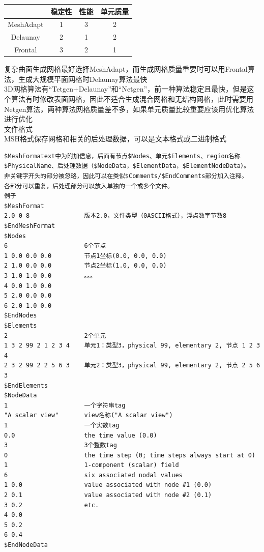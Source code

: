 \documentclass[12pt]{article}
\begin{document}
\begin{CJK}{UTF8}{gkai}
\begin{table}
	\centering
\begin{tabular}{ cccc }   
	\hline
&稳定性& 性能& 单元质量\\
\hline
MeshAdapt   & 1        & 3 &        2\\
Delaunay     &      2    &     1  &       2\\
Frontal       &        3&         2 &        1\\
\hline
\end{tabular}
\end{table}

复杂曲面生成网格最好选择MeshAdapt，而生成网格质量重要时可以用Frontal算法，生成大规模平面网格时Delaunay算法最快\\
3D网格算法有“Tetgen+Delaunay”和“Netgen”，前一种算法稳定且最快，但是这个算法有时修改表面网格，因此不适合生成混合网格和无结构网格，此时需要用Netgen算法，两种算法网格质量差不多，如果单元质量比较重要应该用优化算法进行优化\\

文件格式\\
MSH格式保存网格和相关的后处理数据，可以是文本格式或二进制格式\\
\begin{verbatim}
$MeshFormatext中为附加信息，后面有节点$Nodes、单元$Elements、region名称$PhysicalName、后处理数据（$NodeData，$ElementData，$ElementNodeData）。
非关键字开头的部分被忽略，因此可以在类似$Comments/$EndComments部分加入注释。
各部分可以重复，后处理部分可以放入单独的一个或多个文件。
例子
$MeshFormat
2.0 0 8               版本2.0，文件类型（0ASCII格式），浮点数字节数8
$EndMeshFormat
$Nodes
6                     6个节点
1 0.0 0.0 0.0         节点1坐标(0.0, 0.0, 0.0)
2 1.0 0.0 0.0         节点2坐标(1.0, 0.0, 0.0)
3 1.0 1.0 0.0         。。。
4 0.0 1.0 0.0
5 2.0 0.0 0.0
6 2.0 1.0 0.0
$EndNodes
$Elements
2                     2个单元
1 3 2 99 2 1 2 3 4    单元1：类型3，physical 99, elementary 2, 节点 1 2 3 4
2 3 2 99 2 2 5 6 3    单元2：类型3，physical 99, elementary 2, 节点 2 5 6 3
$EndElements
$NodeData
1                     一个字符串tag
"A scalar view"       view名称("A scalar view")
1                     一个实数tag
0.0                   the time value (0.0)
3                     3个整数tag
0                     the time step (0; time steps always start at 0)
1                     1-component (scalar) field
6                     six associated nodal values
1 0.0                 value associated with node #1 (0.0)
2 0.1                 value associated with node #2 (0.1)
3 0.2                 etc.
4 0.0
5 0.2
6 0.4
$EndNodeData
\end{verbatim}


    
    
   
    
    
\end{CJK}
\end{document}

